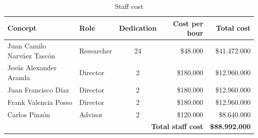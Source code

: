 \documentclass{article}
\theoremstyle{plain}
\theoremstyle{remark}
\begin{document}
\begin{table}[h]
\centering
\caption{Staff cost}
\label{tab:staff-cost}
\footnotesize
\setlength{\tabcolsep}{3pt}
\begin{tabular}{@{}l l c r r@{}}
\toprule
\textbf{Concept} & \textbf{Role} & \textbf{Dedication} & \textbf{Cost per hour} & \textbf{Total cost}\\
\midrule
Juan Camilo Narváez Tascón & Researcher & 24 & \$48.000 & \$41.472.000\\
Jesús Alexander Aranda & Director & 2 & \$180.000 & \$12.960.000\\
Juan Francisco Díaz & Director & 2 & \$180.000 & \$12.960.000\\
Frank Valencia Posso & Director & 2 & \$180.000 & \$12.960.000\\
Carlos Pinzón & Advisor & 2 & \$120.000 & \$8.640.000\\
\midrule
\multicolumn{4}{r}{\textbf{Total staff cost}} & \textbf{\$88.992.000}\\
\bottomrule
\end{tabular}
\end{table}
\end{document}

